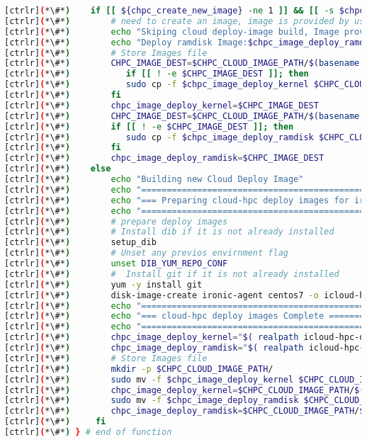 \begin{lstlisting}[language=bash,keywords={}]
[ctrlr](*\#*)    if [[ ${chpc_create_new_image} -ne 1 ]] && [[ -s $chpc_image_deploy_kernel ]] && [[ -s $chpc_image_deploy_ramdisk ]]; then
[ctrlr](*\#*)        # need to create an image, image is provided by user
[ctrlr](*\#*)        echo "Skiping cloud deploy-image build, Image provided:"
[ctrlr](*\#*)        echo "Deploy ramdisk Image:$chpc_image_deploy_ramdisk"
[ctrlr](*\#*)        # Store Images file
[ctrlr](*\#*)        CHPC_IMAGE_DEST=$CHPC_CLOUD_IMAGE_PATH/$(basename $chpc_image_deploy_kernel)
[ctrlr](*\#*)           if [[ ! -e $CHPC_IMAGE_DEST ]]; then
[ctrlr](*\#*)           sudo cp -f $chpc_image_deploy_kernel $CHPC_CLOUD_IMAGE_PATH/
[ctrlr](*\#*)        fi
[ctrlr](*\#*)        chpc_image_deploy_kernel=$CHPC_IMAGE_DEST
[ctrlr](*\#*)        CHPC_IMAGE_DEST=$CHPC_CLOUD_IMAGE_PATH/$(basename $chpc_image_deploy_ramdisk)
[ctrlr](*\#*)        if [[ ! -e $CHPC_IMAGE_DEST ]]; then
[ctrlr](*\#*)           sudo cp -f $chpc_image_deploy_ramdisk $CHPC_CLOUD_IMAGE_PATH/
[ctrlr](*\#*)        fi
[ctrlr](*\#*)        chpc_image_deploy_ramdisk=$CHPC_IMAGE_DEST
[ctrlr](*\#*)    else
[ctrlr](*\#*)        echo "Building new Cloud Deploy Image"
[ctrlr](*\#*)        echo "====================================================================="
[ctrlr](*\#*)        echo "=== Preparing cloud-hpc deploy images for ironic====================="
[ctrlr](*\#*)        echo "====================================================================="
[ctrlr](*\#*)        # prepare deploy images
[ctrlr](*\#*)        # Install dib if it is not already installed
[ctrlr](*\#*)        setup_dib
[ctrlr](*\#*)        # Unset any previos envirnment flag
[ctrlr](*\#*)        unset DIB_YUM_REPO_CONF   
[ctrlr](*\#*)        #  Install git if it is not already installed
[ctrlr](*\#*)        yum -y install git
[ctrlr](*\#*)        disk-image-create ironic-agent centos7 -o icloud-hpc-deploy-c7
[ctrlr](*\#*)        echo "====================================================================="
[ctrlr](*\#*)        echo "=== cloud-hpc deploy images Complete ================================"
[ctrlr](*\#*)        echo "====================================================================="
[ctrlr](*\#*)        chpc_image_deploy_kernel="$( realpath icloud-hpc-deploy-c7.kernel)"
[ctrlr](*\#*)        chpc_image_deploy_ramdisk="$( realpath icloud-hpc-deploy-c7.initramfs)"
[ctrlr](*\#*)        # Store Images file
[ctrlr](*\#*)        mkdir -p $CHPC_CLOUD_IMAGE_PATH/
[ctrlr](*\#*)        sudo mv -f $chpc_image_deploy_kernel $CHPC_CLOUD_IMAGE_PATH/
[ctrlr](*\#*)        chpc_image_deploy_kernel=$CHPC_CLOUD_IMAGE_PATH/$(basename $chpc_image_deploy_kernel)
[ctrlr](*\#*)        sudo mv -f $chpc_image_deploy_ramdisk $CHPC_CLOUD_IMAGE_PATH/
[ctrlr](*\#*)        chpc_image_deploy_ramdisk=$CHPC_CLOUD_IMAGE_PATH/$(basename $chpc_image_deploy_ramdisk)
[ctrlr](*\#*)     fi
[ctrlr](*\#*) } # end of function
\end{lstlisting}




